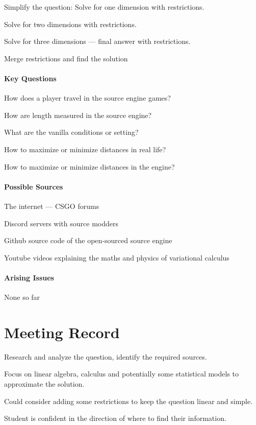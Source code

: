 \documentclass[a4paper,12pt]{article}
\begin{document}
Simplify the question: Solve for one dimension with restrictions.

Solve for two dimensions with restrictions.

Solve for three dimensions --- final answer with restrictions.

Merge restrictions and find the solution

\paragraph{Key Questions}
How does a player travel in the source engine games?

How are length measured in the source engine?

What are the vanilla conditions or setting?

How to maximize or minimize distances in real life?

How to maximize or minimize distances in the engine?

\paragraph{Possible Sources}
The internet --- CSGO forums

Discord servers with source modders

Github source code of the open-sourced source engine

Youtube videos explaining the maths and physics of variational calculus

\paragraph{Arising Issues}
None so far

\section{Meeting Record}
Research and analyze the question, identify the required sources.

Focus on linear algebra, calculus and potentially some statistical models to approximate the solution.

Could consider adding some restrictions to keep the question linear and simple.

Student is confident in the direction of where to find their information.
\end{document}

